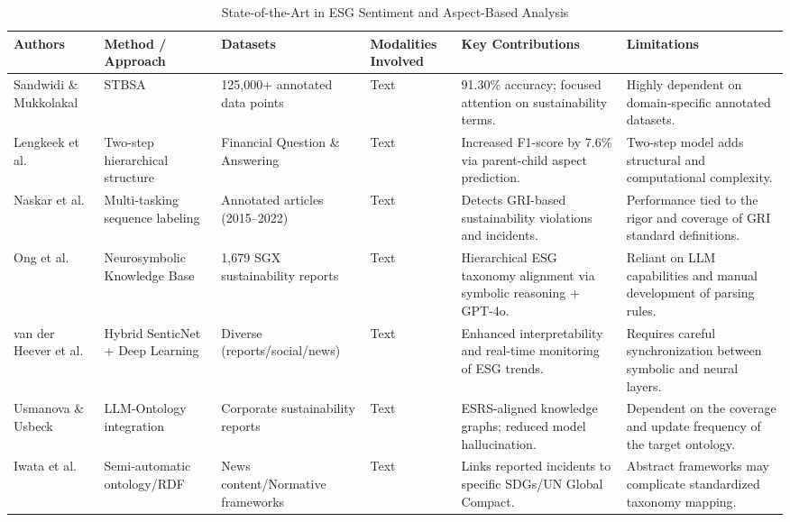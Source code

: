 \documentclass[english, online, cse, master]{dithesis}
\begin{document}
\begin{landscape}
\begin{table}[p]
\centering
\caption{State-of-the-Art in ESG Sentiment and Aspect-Based Analysis}
\label{tab:esg-sentiment-aspect-analysis}
\small
\renewcommand{\arraystretch}{1.2}
\begin{tabularx}{\linewidth}{|p{1.8cm}|p{3cm}|p{3cm}|p{1.8cm}|X|X|}
\hline
Authors & Method / Approach & Datasets & Modalities Involved & Key Contributions & Limitations \\ \hline
Sandwidi \& Mukkolakal  \parencite{blaise_sandwidi_c58b16e0} & STBSA & 125,000+ annotated data points & Text & 91.30\% accuracy; focused attention on sustainability terms. & Highly dependent on domain-specific annotated datasets. \\ \hline
Lengkeek et al.  \parencite{matteo_lengkeek_5d9f2a4e} & Two-step hierarchical structure & Financial Question \& Answering & Text & Increased F1-score by 7.6\% via parent-child aspect prediction. & Two-step model adds structural and computational complexity. \\ \hline
Naskar et al.  \parencite{abir_naskar_17efeb7b} & Multi-tasking sequence labeling & Annotated articles (2015–2022) & Text & Detects GRI-based sustainability violations and incidents. & Performance tied to the rigor and coverage of GRI standard definitions. \\ \hline
Ong et al.  \parencite{keane_ong_8fec4760} & Neurosymbolic Knowledge Base & 1,679 SGX sustainability reports & Text & Hierarchical ESG taxonomy alignment via symbolic reasoning + GPT-4o. & Reliant on LLM capabilities and manual development of parsing rules. \\ \hline
van der Heever et al.  \parencite{wihan_van_der_heever_5ff35709} & Hybrid SenticNet + Deep Learning & Diverse (reports/social/news) & Text & Enhanced interpretability and real-time monitoring of ESG trends. & Requires careful synchronization between symbolic and neural layers. \\ \hline
Usmanova \& Usbeck  \parencite{aida_usmanova_e9b44e1d} & LLM-Ontology integration & Corporate sustainability reports & Text & ESRS-aligned knowledge graphs; reduced model hallucination. & Dependent on the coverage and update frequency of the target ontology. \\ \hline
Iwata et al.  \parencite{tsuyoshi_iwata_18ccc0b8} & Semi-automatic ontology/RDF & News content/Normative frameworks & Text & Links reported incidents to specific SDGs/UN Global Compact. & Abstract frameworks may complicate standardized taxonomy mapping. \\ \hline

\end{tabularx}
\end{table}
\end{landscape}
\end{document}
